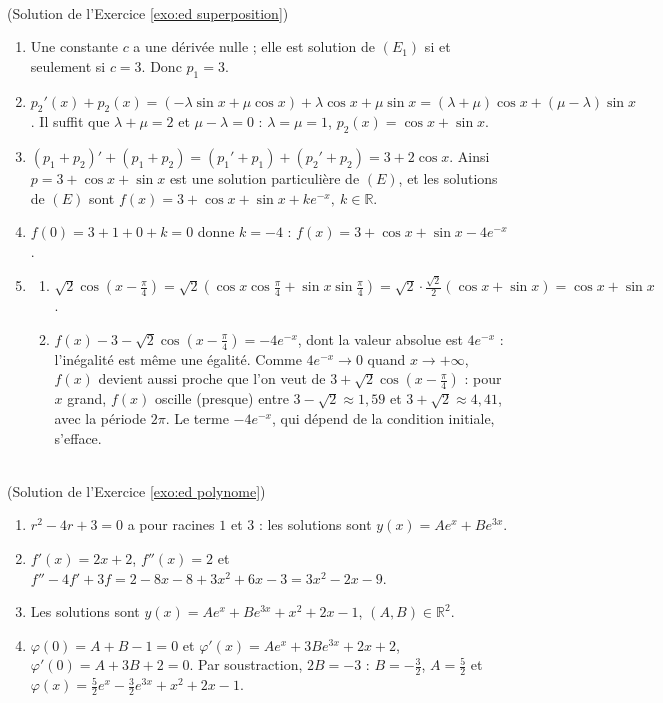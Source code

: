 \begin{corrige}
\begin{sol} ~ \\
(Solution de l'Exercice \ref{exo:ed superposition})
\begin{enumerate}
\item Une constante $c$ a une d\'eriv\'ee nulle ; elle est solution de $(E_1)$ si et seulement si $c = 3$. Donc $p_1 = 3$.
\item $p_2'(x) + p_2(x) = (-\lambda \sin x + \mu \cos x) + \lambda \cos x + \mu \sin x = (\lambda + \mu)\cos x + (\mu - \lambda) \sin x$.
      Il suffit que $\lambda + \mu = 2$ et $\mu - \lambda = 0$ : $\lambda = \mu = 1$, $p_2(x) = \cos x + \sin x$.
\item $(p_1 + p_2)' + (p_1 + p_2) = (p_1' + p_1) + (p_2' + p_2) = 3 + 2\cos x$.
      Ainsi $p = 3 + \cos x + \sin x$ est une solution particuli\`ere de $(E)$, et les solutions de $(E)$ sont
      $\boxed{f(x) = 3 + \cos x + \sin x + k e^{-x}, \ k \in \mathbb{R}}$.
\item $f(0) = 3 + 1 + 0 + k = 0$ donne $k = -4$ : $\boxed{f(x) = 3 + \cos x + \sin x - 4 e^{-x}}$.
\item \begin{enumerate}
      \item $\sqrt{2}\cos\left(x - \frac{\pi}{4}\right) = \sqrt{2}\left(\cos x \cos\frac{\pi}{4} + \sin x \sin\frac{\pi}{4}\right)
            = \sqrt{2} \cdot \frac{\sqrt{2}}{2}(\cos x + \sin x) = \cos x + \sin x$.
      \item $f(x) - 3 - \sqrt{2}\cos\left(x - \frac{\pi}{4}\right) = -4 e^{-x}$, dont la valeur absolue est $4e^{-x}$ :
            l'in\'egalit\'e est m\^eme une \'egalit\'e. Comme $4e^{-x} \to 0$ quand $x \to +\infty$, $f(x)$ devient
            aussi proche que l'on veut de $3 + \sqrt{2}\cos\left(x - \frac{\pi}{4}\right)$ : pour $x$ grand, $f(x)$ oscille
            (presque) entre $3 - \sqrt{2} \approx 1{,}59$ et $3 + \sqrt{2} \approx 4{,}41$, avec la p\'eriode $2\pi$.
            Le terme $-4e^{-x}$, qui d\'epend de la condition initiale, s'efface.
      \end{enumerate}
\end{enumerate}
\end{sol}

\begin{sol} ~ \\
(Solution de l'Exercice \ref{exo:ed polynome})
\begin{enumerate}
\item $r^2 - 4r + 3 = 0$ a pour racines $1$ et $3$ : les solutions sont $y(x) = A e^{x} + B e^{3x}$.
\item $f'(x) = 2x + 2$, $f''(x) = 2$ et $f'' - 4f' + 3f = 2 - 8x - 8 + 3x^2 + 6x - 3 = 3x^2 - 2x - 9$.
\item Les solutions sont $y(x) = A e^{x} + B e^{3x} + x^2 + 2x - 1$, $(A,B) \in \mathbb{R}^2$.
\item $\varphi(0) = A + B - 1 = 0$ et $\varphi'(x) = A e^{x} + 3B e^{3x} + 2x + 2$, $\varphi'(0) = A + 3B + 2 = 0$.
      Par soustraction, $2B = -3$ : $B = -\frac{3}{2}$, $A = \frac{5}{2}$ et
      $\boxed{\varphi(x) = \frac{5}{2} e^{x} - \frac{3}{2} e^{3x} + x^2 + 2x - 1}$.
\end{enumerate}
\end{sol}


\end{corrige}
